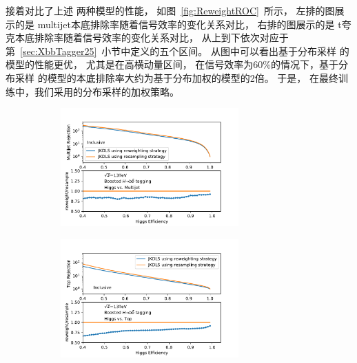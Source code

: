 接着对比了上述
两种模型的性能，
如图~\ref{fig:ReweightROC}~所示，
左排的图展示的是
multijet本底排除率随着信号效率的变化关系对比，
右排的图展示的是
t夸克本底排除率随着信号效率的变化关系对比，
从上到下依次对应于第~\ref{sec:XbbTagger25}~小节中定义的五个区间。
从图中可以看出基于分布采样
的模型的性能更优，
尤其是在高横动量区间，
在信号效率为60\%的情况下，基于分布采样
的模型的本底排除率大约为基于分布加权的模型的2倍。
于是，
在最终训练中，我们采用的分布采样的加权策略。

\begin{figure}[htbp]
  \begin{subfigure}{.5\textwidth}
  \centering
   \includegraphics[width=0.75\textwidth]{figuresXbb/Reweight/QCDIN.pdf}
   \caption{}
  \end{subfigure}
  \begin{subfigure}{.5\textwidth}
  \centering
   \includegraphics[width=0.75\textwidth]{figuresXbb/Reweight/TOPIN.pdf}
   \caption{}
  \end{subfigure}
\newline 

\end{figure}
